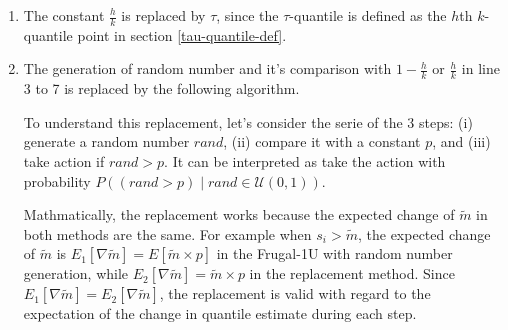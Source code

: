 \begin{enumerate}
    \item The constant $\frac{h}{k}$ is replaced by $\tau$, since the $\tau$-quantile is defined
     as the $h$th $k$-quantile point in section \ref{tau-quantile-def}.
    \item The generation of random number and it's comparison with $1-\frac{h}{k}$ or $\frac{h}{k}$
    in line 3 to 7 is replaced by the following algorithm.
    \begin{algorithm}
        \begin{algorithmic}[1]
            \setcounter{ALG@line}{2}
            \State{ }   
            \EndIf 
        \end{algorithmic}
    \end{algorithm}

    
    To understand this replacement, let's consider the serie of the 3 steps: 
    (i) generate a random number $rand$, 
    (ii) compare it with a constant $p$, and
    (iii) take action if $rand > p$. 
    It can be interpreted as take the action with probability 
    $P((rand > p) \mid rand \in \mathcal{U}(0,1))$. 

    Mathmatically, the replacement works because the expected change of
    $\tilde{m}$ in both methods are the same. 
    For example when $s_i > \tilde{m}$, 
    the expected change of $\tilde{m}$ is
    $E_1[\nabla \tilde{m}] = E[\tilde{m} \times p]$ in the Frugal-1U with 
    random number generation,
    while 
    $E_2[\nabla \tilde{m}] = \tilde{m} \times p$ in the replacement method.
    Since $E_1[\nabla \tilde{m}] = E_2[\nabla \tilde{m}]$, the replacement is valid
    with regard to the expectation of the change in quantile estimate during each step.

\end{enumerate}


